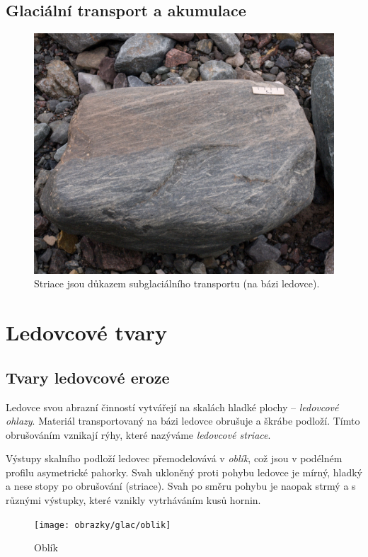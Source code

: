 \subsection{Glaciální transport a akumulace}
\begin{figure}
	\centering
	\includegraphics[width=1\linewidth]{obrazky/glac/striace}
	\caption{Striace jsou důkazem subglaciálního transportu (na bázi ledovce).}
	\label{fig:striace}
\end{figure}

\section{Ledovcové tvary}
\subsection{Tvary ledovcové eroze}
Ledovce svou abrazní činností vytvářejí na skalách hladké plochy -- \emph{ledovcové ohlazy}. Materiál transportovaný na bázi ledovce obrušuje a škrábe podloží. Tímto obrušováním vznikají rýhy, které nazýváme \emph{ledovcové striace}. 

Výstupy skalního podloží ledovec přemodelovává v \emph{oblík}, což jsou v podélném profilu asymetrické pahorky. Svah ukloněný proti pohybu ledovce je mírný, hladký a nese stopy po obrušování (striace). Svah po směru pohybu je naopak strmý a s různými výstupky, které vznikly vytrháváním kusů hornin. 

\begin{figure}
	\centering
	\texttt{[image: obrazky/glac/oblik]}
	\caption{Oblík}
	\label{fig:oblik}
\end{figure}

